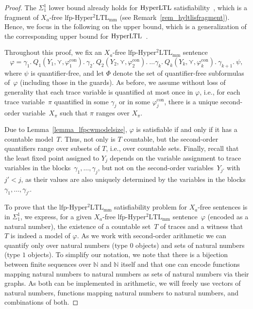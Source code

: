 \documentclass[dvipsnames,10pt,a4paper]{amsart}
\theoremstyle{definition}
\theoremstyle{remark}
\newcommand{\nats}{\mathbb{N}}
\renewcommand{\phi}{\varphi}
\newcommand{\hyltl}{\mathrm{Hyper\-LTL}\xspace}
\newcommand{\lfpsohyltlfp}{\mathrm{lfp\text{-}{Hyper^2LTL_{\mathrm{mm}}}}\xspace}
\newcommand{\univar}{X_a}
\newcommand{\smallest}{\curlyvee}
\newcommand{\con}{\mathrm{con}}
\newcommand{\quant}{Q}
\begin{document}
\begin{proof}
The $\Sigma_1^1$ lower bound already holds for $\hyltl$ satisfiability~\cite{hyperltlsatconf}, which is a fragment of $\univar$-free $\lfpsohyltlfp$ (see Remark~\ref{rem_hyltlisfragment}). 
Hence, we focus in the following on the upper bound, which is a generalization of the corresponding upper bound for $\hyltl$~\cite{hyperltlsatconf}.

Throughout this proof, we fix an $\univar$-free $\lfpsohyltlfp$ sentence
\[
\varphi =
\gamma_1.\ \quant_1 (Y_1, \smallest, \phi_1^\con).\ 
\gamma_2.\ \quant_2(Y_2, \smallest, \phi_2^\con).\ 
\ldots 
\gamma_k.\ \quant_k(Y_k, \smallest, \phi_k^\con).\
\gamma_{k+1}.\
\psi
,\] where $\psi$ is quantifier-free, and let $\Phi$ denote the set of quantifier-free subformulas of~$\varphi$ (including those in the guards). As before, we assume without loss of generality that each trace variable is quantified at most once in $\varphi$, i.e., for each trace variable~$\pi$ quantified in some $\gamma_j$ or in some $\phi_j^\con$, there is a unique second-order variable~$X_\pi$ such that $\pi$ ranges over $X_\pi$.

Due to Lemma~\ref{lemma_lfpcwmodelsize}, $\varphi$ is satisfiable if and only if it has a countable model~$T$. Thus, not only is $T$ countable, but the second-order quantifiers range over subsets of $T$, i.e., over countable sets. 
Finally, recall that the least fixed point assigned to $Y_j$ depends on the variable assignment to trace variables in the blocks~$\gamma_1,\ldots, \gamma_j$, but not on the second-order variables~$Y_{j'}$ with $j' < j$, as their values are also uniquely determined by the variables in the blocks~$\gamma_1,\ldots, \gamma_{j'}$.


To prove that the $\lfpsohyltlfp$ satisfiability problem for $\univar$-free sentences is in $\Sigma_1^1$, we express, for a given $\univar$-free $\lfpsohyltlfp$ sentence~$\phi$ (encoded as a natural number), the existence of a countable set~$T$ of traces and a witness that $T$ is indeed a model of $\varphi$.
As we work with second-order arithmetic we can quantify only over natural numbers (type $0$ objects) and sets of natural numbers (type $1$ objects). To simplify our notation, we note that there is a bijection between finite sequences over $\nats$ and $\nats$ itself and that one can encode functions mapping natural numbers to natural numbers as sets of natural numbers via their graphs. As both can be implemented in arithmetic, we will freely use vectors of natural numbers, functions mapping natural numbers to natural numbers, and combinations of both. 


\end{proof}
\end{document}

